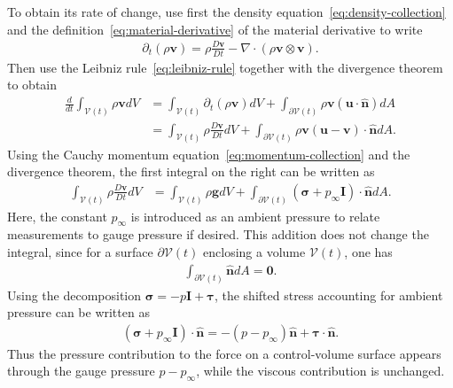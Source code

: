To obtain its rate of change, use first the density equation~\eqref{eq:density-collection} and the definition~\eqref{eq:material-derivative} of the
material derivative to write
\begin{align}
    \partial_t(\rho\bm{v})=\rho\frac{D\bm{v}}{Dt}-\nabla\cdot(\rho\bm{v}\otimes\bm{v}).
\end{align}
Then use the Leibniz rule~\eqref{eq:leibniz-rule} together with the divergence theorem to obtain
\begin{align}
    \frac{d}{dt}\int_{\mathcal{V}(t)}\rho\bm{v}dV&=\int_{\mathcal{V}(t)}\partial_t(\rho\bm{v})dV+\int_{\partial \mathcal{V}(t)}\rho\bm{v}(\bm{u}\cdot\bm{\hat{n}}) dA\nonumber\\
    &=\int_{\mathcal{V}(t)}\rho\frac{D\bm{v}}{Dt}dV+\int_{\partial \mathcal{V}(t)}\rho\bm{v}(\bm{u}-\bm{v})\cdot\bm{\hat{n}} dA.
\end{align}
Using the Cauchy momentum equation~\eqref{eq:momentum-collection} and the divergence theorem, the first integral on the right can be written as
\begin{align}
    \int_{\mathcal{V}(t)}\rho\frac{D\bm{v}}{Dt}dV&=\int_{\mathcal{V}(t)}\rho\bm{g}dV+\int_{\partial \mathcal{V}(t)}(\bm{\sigma}+p_\infty\bm{I})\cdot\bm{\hat{n}} dA.
\end{align}
Here, the constant $p_\infty$ is introduced as an ambient pressure to relate measurements to gauge pressure if desired. This addition does not change the integral, since for a surface $\partial\mathcal{V}(t)$ enclosing a volume $\mathcal{V}(t)$, one has 
\begin{align}
    \int_{\partial \mathcal{V}(t)}\bm{\hat{n}}dA=\bm{0}.
\end{align}
Using the decomposition $\bm{\sigma}=-p\bm{I}+\bm{\tau}$, the shifted stress accounting for ambient pressure can be written as
\begin{align}
    (\bm{\sigma}+p_\infty\bm{I})\cdot\bm{\hat n}
    =
    -(p-p_\infty)\bm{\hat n}
    +
    \bm{\tau}\cdot\bm{\hat n}.
\end{align}
Thus the pressure contribution to the force on a control-volume surface appears through the gauge pressure $p-p_\infty$, while the viscous contribution is unchanged.

